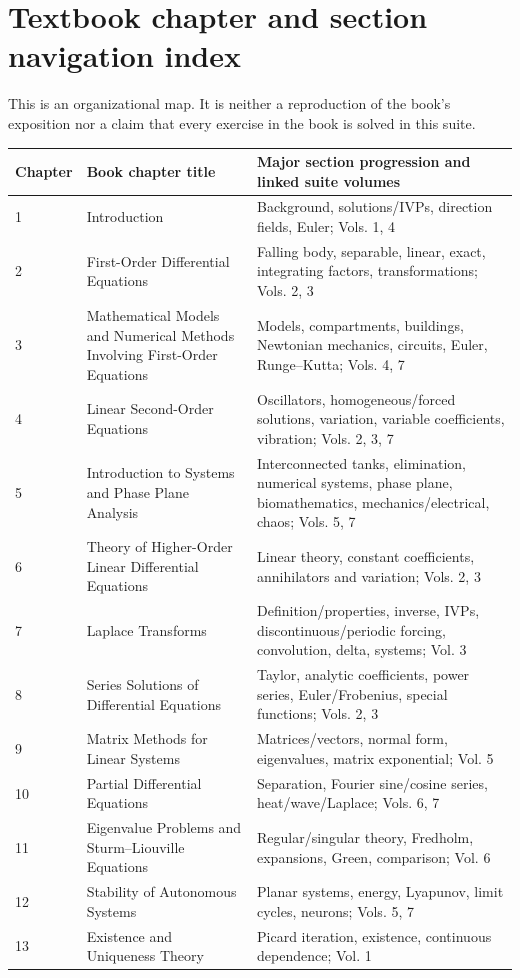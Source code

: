 \documentclass[11pt,letterpaper,oneside]{report}
\theoremstyle{definition}\newtheorem{definition}[theorem]{Definition}
\theoremstyle{remark}\newtheorem{remark}[theorem]{Remark}
\begin{document}
\chapter{Textbook chapter and section navigation index}
\begin{bookground}This is an organizational map. It is neither a reproduction of the book's exposition nor a claim that every exercise in the book is solved in this suite.\end{bookground}
\small
\begin{longtable}{p{}>{\raggedright\arraybackslash}p{}>{\raggedright\arraybackslash}p{}}
\toprule Chapter & Book chapter title & Major section progression and linked suite volumes \\ \midrule\endhead
1 & Introduction & Background, solutions/IVPs, direction fields, Euler; Vols. 1, 4 \\
2 & First-Order Differential Equations & Falling body, separable, linear, exact, integrating factors, transformations; Vols. 2, 3 \\
3 & Mathematical Models and Numerical Methods Involving First-Order Equations & Models, compartments, buildings, Newtonian mechanics, circuits, Euler, Runge--Kutta; Vols. 4, 7 \\
4 & Linear Second-Order Equations & Oscillators, homogeneous/forced solutions, variation, variable coefficients, vibration; Vols. 2, 3, 7 \\
5 & Introduction to Systems and Phase Plane Analysis & Interconnected tanks, elimination, numerical systems, phase plane, biomathematics, mechanics/electrical, chaos; Vols. 5, 7 \\
6 & Theory of Higher-Order Linear Differential Equations & Linear theory, constant coefficients, annihilators and variation; Vols. 2, 3 \\
7 & Laplace Transforms & Definition/properties, inverse, IVPs, discontinuous/periodic forcing, convolution, delta, systems; Vol. 3 \\
8 & Series Solutions of Differential Equations & Taylor, analytic coefficients, power series, Euler/Frobenius, special functions; Vols. 2, 3 \\
9 & Matrix Methods for Linear Systems & Matrices/vectors, normal form, eigenvalues, matrix exponential; Vol. 5 \\
10 & Partial Differential Equations & Separation, Fourier sine/cosine series, heat/wave/Laplace; Vols. 6, 7 \\
11 & Eigenvalue Problems and Sturm--Liouville Equations & Regular/singular theory, Fredholm, expansions, Green, comparison; Vol. 6 \\
12 & Stability of Autonomous Systems & Planar systems, energy, Lyapunov, limit cycles, neurons; Vols. 5, 7 \\
13 & Existence and Uniqueness Theory & Picard iteration, existence, continuous dependence; Vol. 1 \\
\bottomrule
\end{longtable}
\normalsize
\end{document}
